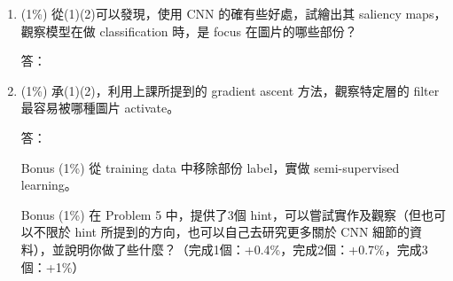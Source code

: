 \documentclass[12pt,a4paper]{extarticle}
\begin{document}
\begin{enumerate}
  \newpage

	\item (1\%) 從(1)(2)可以發現，使用 CNN 的確有些好處，試繪出其 saliency maps，觀察模型在做 classification 時，是 focus 在圖片的哪些部份？
	\par 答：

	\item (1\%) 承(1)(2)，利用上課所提到的 gradient ascent 方法，觀察特定層的 filter 最容易被哪種圖片 activate。
	\par 答：

	\item[Bonus] (1\%) 從 training data 中移除部份 label，實做 semi-supervised learning。

	\item[Bonus] (1\%) 在 Problem 5 中，提供了3個 hint，可以嘗試實作及觀察（但也可以不限於 hint 所提到的方向，也可以自己去研究更多關於 CNN 細節的資料），並說明你做了些什麼？（完成1個：+0.4\%，完成2個：+0.7\%，完成3個：+1\%）

\end{enumerate}
\end{document}
